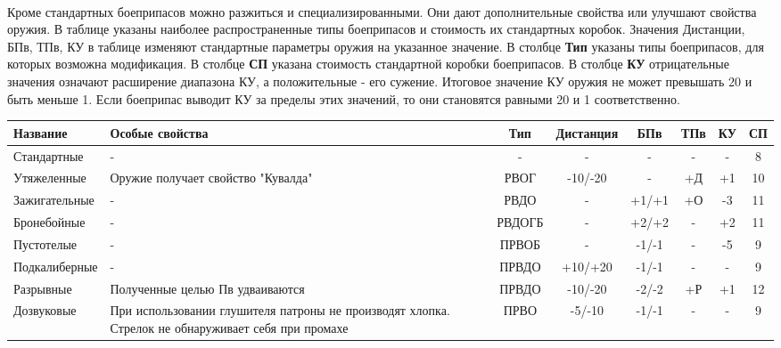 \paragraph{} Кроме стандартных боеприпасов можно разжиться и специализированными. Они дают дополнительные свойства или улучшают свойства оружия. В таблице указаны наиболее распространенные типы боеприпасов и стоимость их стандартных коробок. Значения Дистанции, БПв, ТПв, КУ в таблице изменяют стандартные параметры оружия на указанное значение. 
\newline В столбце \textbf{Тип} указаны типы боеприпасов, для которых возможна модификация.
\newline В столбце \textbf{СП} указана стоимость стандартной коробки боеприпасов. 
\newline В столбце \textbf{КУ} отрицательные значения означают расширение диапазона КУ, а положительные - его сужение. Итоговое значение КУ оружия не может превышать 20 и быть меньше 1. Если боеприпас выводит КУ за пределы этих значений, то они становятся равными 20 и 1 соответственно. 

\begin{longtable}{|p{3cm}|p{2.5cm}|c||c|c|c|c||c|}\hline
Название & Особые свойства & Тип & Дистанция & БПв & ТПв & КУ & СП\\ \hline
Стандартные & - & - & - & - & - & - & 8\\ \hline
Утяжеленные & Оружие получает свойство "Кувалда" & РВОГ & -10/-20 & - & +Д & +1 & 10\\ \hline
Зажигательные & - & РВДО & - & +1/+1 & +О & -3 & 11\\ \hline
Бронебойные & - & РВДОГБ & - & +2/+2 & - & +2 & 11\\ \hline
Пустотелые & - & ПРВОБ & - & -1/-1 & - & -5 & 9\\ \hline
Подкалиберные & - & ПРВДО & +10/+20 & -1/-1 & - & - & 9\\ \hline
Разрывные & Полученные целью Пв удваиваются & ПРВДО & -10/-20 & -2/-2 & +Р & +1 & 12\\ \hline
Дозвуковые & При использовании глушителя патроны не производят хлопка. Стрелок не обнаруживает себя при промахе & ПРВО & -5/-10 & -1/-1 & - & - & 9\\ \hline
\end{longtable}
